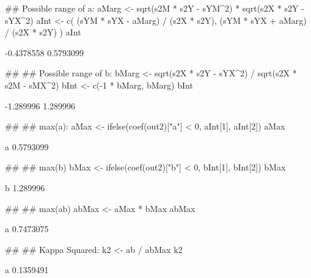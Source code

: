 \begin{Schunk}
\begin{Sinput}
 ## Possible range of a:
 aMarg <- sqrt(s2M * s2Y - sYM^2) * sqrt(s2X * s2Y - sYX^2)
 aInt <- c(
     (sYM * sYX - aMarg) / (s2X * s2Y),
     (sYM * sYX + aMarg) / (s2X * s2Y)
 )
 aInt
\end{Sinput}
\begin{Soutput}
[1] -0.4378558  0.5793099
\end{Soutput}
\begin{Sinput}
 ##
 ## Possible range of b:
 bMarg <- sqrt(s2X * s2Y - sYX^2) / sqrt(s2X * s2M - sMX^2)
 bInt <- c(-1 * bMarg, bMarg)
 bInt
\end{Sinput}
\begin{Soutput}
[1] -1.289996  1.289996
\end{Soutput}
\begin{Sinput}
 ##
 ## max(a):
 aMax <- ifelse(coef(out2)["a"] < 0,
                aInt[1],
                aInt[2])
 aMax
\end{Sinput}
\begin{Soutput}
        a 
0.5793099 
\end{Soutput}
\begin{Sinput}
 ##
 ## max(b)
 bMax <- ifelse(coef(out2)["b"] < 0,
                bInt[1],
                bInt[2])
 bMax
\end{Sinput}
\begin{Soutput}
       b 
1.289996 
\end{Soutput}
\begin{Sinput}
 ##
 ## max(ab)
 abMax <- aMax * bMax
 abMax
\end{Sinput}
\begin{Soutput}
        a 
0.7473075 
\end{Soutput}
\begin{Sinput}
 ##
 ## Kappa Squared:
 k2 <- ab / abMax
 k2
\end{Sinput}
\begin{Soutput}
        a 
0.1359491 
\end{Soutput}
\end{Schunk}

